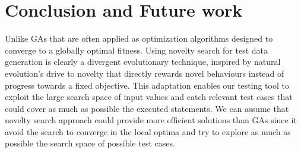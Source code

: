 \documentclass[conference]{IEEEtran}
\begin{document}
%





\section{Conclusion and Future work}
Unlike GAs that are often applied as optimization algorithms designed to converge to a globally optimal fitness. Using novelty search for test data generation is clearly a divergent evolutionary technique, inspired by natural evolution's drive to novelty that directly rewards novel behaviours instead of progress towards a fixed objective. This adaptation enables our testing tool to exploit the large search space of input values and catch relevant test cases that could cover as much as possible the executed statements. We can assume that novelty search approach could provide more efficient solutions than GAs since it avoid the search to converge in the local optima and try to explore as much as possible the search space of possible test cases. 
\end{document}

